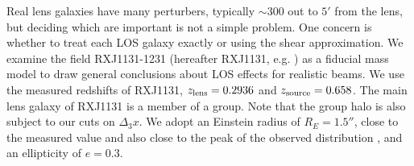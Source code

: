 Real lens galaxies have many perturbers, typically $\sim 300$ out to $5'$ from the lens, but deciding which are important is not a simple problem. One concern is whether to treat each LOS galaxy exactly or using the shear approximation. We examine the field RXJ1131-1231 (hereafter RXJ1131, e.g. \citealt{Suyu13}) as a fiducial mass model to draw general conclusions about LOS effects for realistic beams. We use the measured redshifts of RXJ1131, $z_{\rm{lens}} = 0.2936$ and $z_{\rm{source}} = 0.658$.  The main lens galaxy of RXJ1131 is a member of a group. Note that the group halo is also subject to our cuts on $\Delta_3 x$. We adopt an Einstein radius of $R_E = 1.5''$, close to the measured value \citep{Suyu13} and also close to the peak of the observed distribution \citep{Sonnenfeld13}, and an ellipticity of $e=0.3$.
  
  
  
  